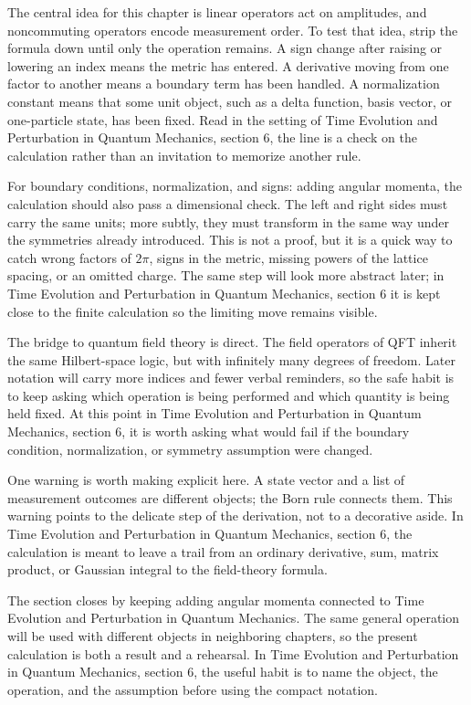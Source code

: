 The central idea for this chapter is linear operators act on amplitudes, and noncommuting operators encode measurement order.  To test that idea, strip the formula down until only the operation remains.  A sign change after raising or lowering an index means the metric has entered.  A derivative moving from one factor to another means a boundary term has been handled.  A normalization constant means that some unit object, such as a delta function, basis vector, or one-particle state, has been fixed.  Read in the setting of Time Evolution and Perturbation in Quantum Mechanics, section 6, the line is a check on the calculation rather than an invitation to memorize another rule.

For boundary conditions, normalization, and signs: adding angular momenta, the calculation should also pass a dimensional check.  The left and right sides must carry the same units; more subtly, they must transform in the same way under the symmetries already introduced.  This is not a proof, but it is a quick way to catch wrong factors of \(2\pi\), signs in the metric, missing powers of the lattice spacing, or an omitted charge.  The same step will look more abstract later; in Time Evolution and Perturbation in Quantum Mechanics, section 6 it is kept close to the finite calculation so the limiting move remains visible.

The bridge to quantum field theory is direct.  The field operators of QFT inherit the same Hilbert-space logic, but with infinitely many degrees of freedom.  Later notation will carry more indices and fewer verbal reminders, so the safe habit is to keep asking which operation is being performed and which quantity is being held fixed.  At this point in Time Evolution and Perturbation in Quantum Mechanics, section 6, it is worth asking what would fail if the boundary condition, normalization, or symmetry assumption were changed.

One warning is worth making explicit here.  A state vector and a list of measurement outcomes are different objects; the Born rule connects them.  This warning points to the delicate step of the derivation, not to a decorative aside.  In Time Evolution and Perturbation in Quantum Mechanics, section 6, the calculation is meant to leave a trail from an ordinary derivative, sum, matrix product, or Gaussian integral to the field-theory formula.

The section closes by keeping adding angular momenta connected to Time Evolution and Perturbation in Quantum Mechanics.  The same general operation will be used with different objects in neighboring chapters, so the present calculation is both a result and a rehearsal.  In Time Evolution and Perturbation in Quantum Mechanics, section 6, the useful habit is to name the object, the operation, and the assumption before using the compact notation.




